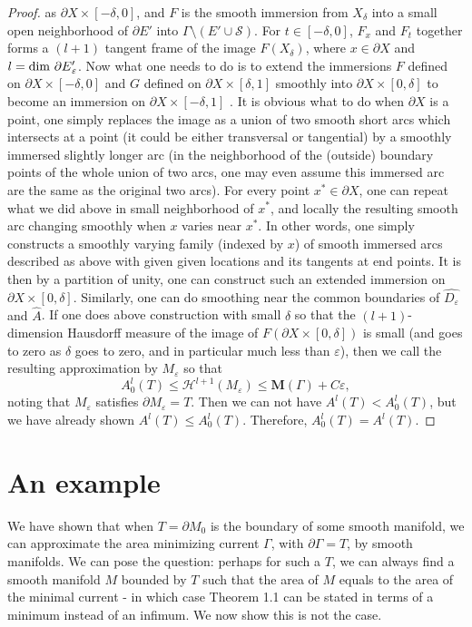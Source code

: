 \documentclass{amsart}
\numberwithin{equation}{section}
\theoremstyle{definition}
\theoremstyle{remark}
\begin{document}
\begin{proof}
as $\partial X \times [-\delta, 0]$, and  $F$ is the smooth immersion from $X_{\delta}$  into a small open neighborhood of
$\partial E'$ into $\Gamma \setminus (E'\cup \mathcal{S}).$  For $t \in [-\delta, 0]$, 
$F_{x}$  and $F_t$ together forms a $(l+1)$ tangent frame of the image $F(X_{\delta})$, where $x \in  \partial X$
and  $l = {\rm{dim}} \ \partial E{_\varepsilon'}$.  Now what one needs to do is to extend the immersions $F$ defined on  $\partial X \times [-\delta, 0]$ and $G$ defined on $\partial X \times [\delta, 1]$ smoothly into  $\partial X \times [0, \delta]$ to become an immersion on   $\partial X \times [-\delta, 1]$ .  It is obvious what to do when $\partial X $ is a point, one simply replaces the image as a union of two smooth short arcs which intersects at a point (it could be either transversal or tangential) by a smoothly immersed slightly longer arc (in the neighborhood of the (outside) boundary points of the whole union of two arcs, one may even assume this
immersed arc are the same as the original two arcs).  For every point $x^* \in  \partial X$, one can 
{repeat what we did above}  in small neighborhood of $x^*$, and locally the resulting smooth arc changing smoothly  
when $x$ varies near $x^*$. In other words, one simply constructs a smoothly varying family (indexed by $x$) of smooth immersed arcs described as above with given given locations and its tangents at end points.  It is then by a partition of unity, one can construct such an extended  immersion on  
$\partial X \times [0, \delta]$. Similarly, one can do  smoothing near the common boundaries of {$\widehat{D_\varepsilon}$ and $\widehat{A}$}. If one does above construction with small $\delta$ so that the $(l+1)$-dimension Hausdorff measure of the image of $F (\partial X \times [0, \delta])$ is small 
(and goes to zero as $\delta$ goes to zero, and in particular much less than $\varepsilon$), then
we call the resulting approximation by $M_\varepsilon$ so that
\[ A^l_0(T) \leq \mathcal{H}^{l+1}(M_\varepsilon) \leq \mathbf{M}(\Gamma) + C\varepsilon,\]
noting that $M_\varepsilon$ satisfies $\partial M_\varepsilon= T$.
Then we can not have $A^l(T) < A_0^l(T)$, but we {have already shown $A^l(T) \leq A_0^l(T)$. Therefore,} $A^l_0(T)=A^l(T).$
\end{proof}

\section{An example}

We have shown that  when $T = \partial M_0$  is the boundary of some smooth manifold, we can approximate the area minimizing current
{$\Gamma$, with $\partial\Gamma=T$,} by smooth manifolds. We can pose the question: perhaps for such a $T$, we can always find a smooth manifold $M$ bounded by $T$ such that {the area of $M$ equals to} the area of the minimal current - in which case 
Theorem 1.1 can be stated in terms of a minimum instead of an infimum. We now show this is not the case.
\end{document}
